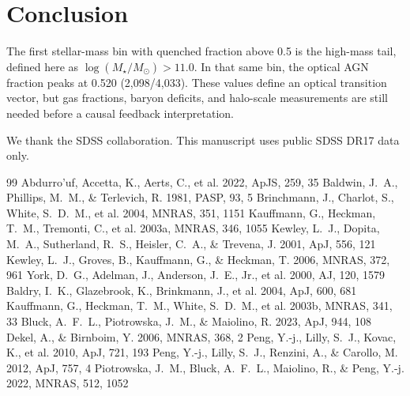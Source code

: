 \documentclass[twocolumn]{aastex631}
\begin{document}
\section{Conclusion}\label{sec:conclusion}
The first stellar-mass bin with quenched fraction above 0.5 is the high-mass tail, defined here as $\log(M_\star/M_\odot) > 11.0$. In that same bin, the optical AGN fraction peaks at 0.520 (2,098/4,033). These values define an optical transition vector, but gas fractions, baryon deficits, and halo-scale measurements are still needed before a causal feedback interpretation.

\begin{acknowledgments}
We thank the SDSS collaboration. This manuscript uses public SDSS DR17 data only.
\end{acknowledgments}
\begin{thebibliography}{99}
 Abdurro'uf, Accetta, K., Aerts, C., et al. 2022, ApJS, 259, 35
 Baldwin, J.~A., Phillips, M.~M., \& Terlevich, R. 1981, PASP, 93, 5
 Brinchmann, J., Charlot, S., White, S.~D.~M., et al. 2004, MNRAS, 351, 1151
 Kauffmann, G., Heckman, T.~M., Tremonti, C., et al. 2003a, MNRAS, 346, 1055
 Kewley, L.~J., Dopita, M.~A., Sutherland, R.~S., Heisler, C.~A., \& Trevena, J. 2001, ApJ, 556, 121
 Kewley, L.~J., Groves, B., Kauffmann, G., \& Heckman, T. 2006, MNRAS, 372, 961
 York, D.~G., Adelman, J., Anderson, J.~E., Jr., et al. 2000, AJ, 120, 1579
 Baldry, I.~K., Glazebrook, K., Brinkmann, J., et al. 2004, ApJ, 600, 681
 Kauffmann, G., Heckman, T.~M., White, S.~D.~M., et al. 2003b, MNRAS, 341, 33
 Bluck, A.~F.~L., Piotrowska, J.~M., \& Maiolino, R. 2023, ApJ, 944, 108
 Dekel, A., \& Birnboim, Y. 2006, MNRAS, 368, 2
 Peng, Y.-j., Lilly, S.~J., Kovac, K., et al. 2010, ApJ, 721, 193
 Peng, Y.-j., Lilly, S.~J., Renzini, A., \& Carollo, M. 2012, ApJ, 757, 4
 Piotrowska, J.~M., Bluck, A.~F.~L., Maiolino, R., \& Peng, Y.-j. 2022, MNRAS, 512, 1052
\end{thebibliography}
\end{document}
